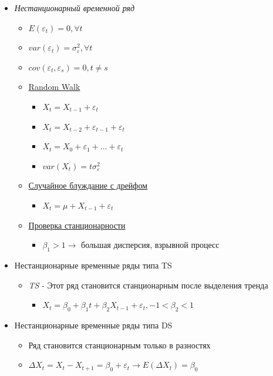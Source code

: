 \documentclass[a4paper, 12pt]{article}
\begin{document}
\begin{itemize}
\begin{itemize}
        \item \textit{Нестанционарный временной ряд}
        \begin{itemize}
            \item $E(\varepsilon_{t}) = 0, \forall t$
            \item $var(\varepsilon_{t}) = \sigma_{\varepsilon}^{2}, \forall t$
            \item $cov(\varepsilon_{t}, \varepsilon_{s}) = 0, t \neq s$
            \item \underline{Random Walk}
            \begin{itemize}
                \item $X_{t} = X_{t-1} + \varepsilon_{t}$
                \item $X_{t} = X_{t-2} + \varepsilon_{t-1} + \varepsilon_{t}$
                \item $X_{t} = X_{0} + \varepsilon_{1} + ... + \varepsilon_{t}$
                \item $var(X_{t}) = t\sigma_{\varepsilon}^{2}$
            \end{itemize}
            \item \underline{Случайное блуждание с дрейфом}
            \begin{itemize}
                \item $X_{t} = \mu + X_{t-1} + \varepsilon_{t}$
            \end{itemize}
            \item \underline{Проверка станционарности}
            \begin{itemize}
                \item $\beta_{1} > 1 \rightarrow$ большая дисперсия, взрывной процесс 
            \end{itemize}
        \end{itemize}
        \item Нестанционарные временные ряды типа TS
        \begin{itemize}
            \item \textit{TS} - Этот ряд становится станционарным после выделения тренда
            \begin{itemize}
                \item $X_{t} = \beta_{0} + \beta_{1}t + \beta_{2}X_{t-1} + \varepsilon_{t}, -1 < \beta_{2} < 1$
            \end{itemize}
        \end{itemize}
        \item Нестанционарные временные ряды типа DS
        \begin{itemize}
            \item Ряд становится станционарным только в разностях
            \item $\Delta X_{t} = X_{t} - X_{t+1} = \beta_{0} + \varepsilon_{t} \rightarrow E(\Delta X_{t}) = \beta_{0}$
        \end{itemize}
    \end{itemize}
\end{itemize}
\end{document}
